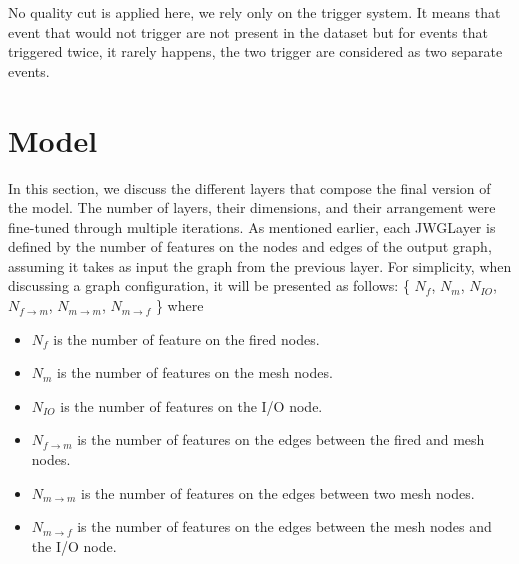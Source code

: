 \documentclass[../main.tex]{subfiles}
\begin{document}
No quality cut is applied here, we rely only on the trigger system. It means that event that would not trigger are not present in the dataset but for events that triggered twice, it rarely happens, the two trigger are considered as two separate events.



\section{Model}

In this section, we discuss the different layers that compose the final version of the model. The number of layers, their dimensions, and their arrangement were fine-tuned through multiple iterations. As mentioned earlier, each JWGLayer is defined by the number of features on the nodes and edges of the output graph, assuming it takes as input the graph from the previous layer. For simplicity, when discussing a graph configuration, it will be presented as follows: \{ {\color{red} $N_{f}$},  {\color{Dandelion} $N_{m}$}, {\color{blue} $N_{IO}$}, $N_{f\rightarrow m}$, $N_{m \rightarrow m}$, $N_{m \rightarrow f}$ \} where
\begin{itemize}
  \item {\color{red} $N_{f}$} is the number of feature on the fired nodes.
  \item {\color{Dandelion} $N_{m}$} is the number of features on the mesh nodes.
  \item {\color{blue} $N_{IO}$} is the number of features on the I/O node.
  \item $N_{f\rightarrow m}$ is the number of features on the edges between the fired and mesh nodes.
  \item $N_{m \rightarrow m}$ is the number of features on the edges between two mesh nodes.
  \item $N_{m \rightarrow f}$ is the number of features on the edges between the mesh nodes and the I/O node.
\end{itemize}
\end{document}
